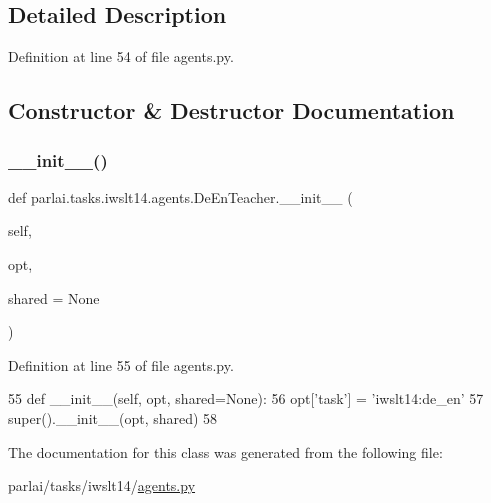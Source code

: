 \subsection{Detailed Description}


Definition at line 54 of file agents.\+py.



\subsection{Constructor \& Destructor Documentation}
\mbox{\label{classparlai_1_1tasks_1_1iwslt14_1_1agents_1_1DeEnTeacher_a1b0090df254e8af7cc6b0073362a400d}} 
\subsubsection{\texorpdfstring{\+\_\+\+\_\+init\+\_\+\+\_\+()}{\_\_init\_\_()}}
{\footnotesize\ttfamily def parlai.\+tasks.\+iwslt14.\+agents.\+De\+En\+Teacher.\+\_\+\+\_\+init\+\_\+\+\_\+ (\begin{DoxyParamCaption}\item[{}]{self,  }\item[{}]{opt,  }\item[{}]{shared = {\ttfamily None} }\end{DoxyParamCaption})}



Definition at line 55 of file agents.\+py.


\begin{DoxyCode}
55     \textcolor{keyword}{def }\_\_init\_\_(self, opt, shared=None):
56         opt[\textcolor{stringliteral}{'task'}] = \textcolor{stringliteral}{'iwslt14:de\_en'}
57         super().\_\_init\_\_(opt, shared)
58 \end{DoxyCode}


The documentation for this class was generated from the following file\+:\begin{DoxyCompactItemize}
\item 
parlai/tasks/iwslt14/\hyperlink{parlai_2tasks_2iwslt14_2agents_8py}{agents.\+py}\end{DoxyCompactItemize}
